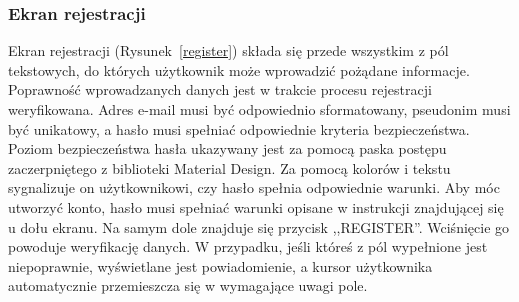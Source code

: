         \subsubsection{Ekran rejestracji}
        Ekran rejestracji (Rysunek~\ref{register}) składa się przede wszystkim z pól tekstowych, do których użytkownik może wprowadzić pożądane informacje. Poprawność wprowadzanych danych jest
        w trakcie procesu rejestracji weryfikowana. Adres e-mail musi być odpowiednio sformatowany, pseudonim musi być unikatowy, a hasło musi spełniać odpowiednie kryteria bezpieczeństwa. Poziom bezpieczeństwa
        hasła ukazywany jest za pomocą paska postępu zaczerpniętego z biblioteki Material Design. Za pomocą kolorów i tekstu sygnalizuje on użytkownikowi, czy hasło spełnia odpowiednie warunki. Aby móc
        utworzyć konto, hasło musi spełniać warunki opisane w instrukcji znajdującej się u dołu ekranu. Na samym dole znajduje się przycisk ,,REGISTER''. Wciśnięcie go powoduje weryfikację danych. W przypadku,
        jeśli któreś z pól wypełnione jest niepoprawnie, wyświetlane jest powiadomienie, a kursor użytkownika automatycznie przemieszcza się w wymagające uwagi pole.

